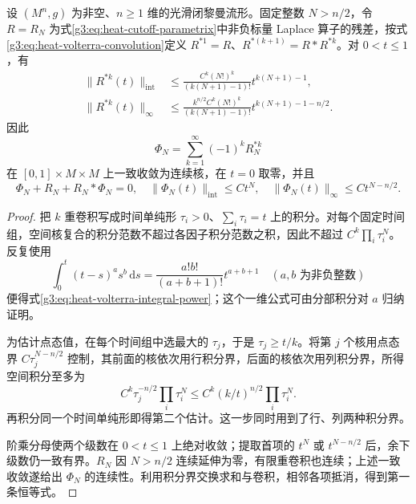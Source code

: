 \begin{lemma}\label{g3:lem:heat-volterra-series}
	设 \((M^n,g)\) 为非空、\(n\ge1\) 维的光滑闭黎曼流形。固定整数 \(N>n/2\)，令 \(R=R_N\) 为式\eqref{g3:eq:heat-cutoff-parametrix}中非负标量 Laplace 算子的残差，按式\eqref{g3:eq:heat-volterra-convolution}定义 \(R^{*1}=R\)、\(R^{*(k+1)}=R*R^{*k}\)。对 \(0<t\le1\)，有
	\begin{align}
		\|R^{*k}(t)\|_{\mathrm{int}}
		&\le\frac{C^k(N!)^k}{(k(N+1)-1)!}
		t^{k(N+1)-1},\label{g3:eq:heat-volterra-integral-power}\\
		\|R^{*k}(t)\|_\infty
		&\le\frac{k^{n/2}C^k(N!)^k}{(k(N+1)-1)!}
		t^{k(N+1)-1-n/2}.\label{g3:eq:heat-volterra-point-power}
	\end{align}
	因此
	\begin{equation}\label{g3:eq:heat-volterra-correction}
		\Phi_N=\sum_{k=1}^\infty(-1)^kR_N^{*k}
	\end{equation}
	在 \([0,1]\times M\times M\) 上一致收敛为连续核，在 \(t=0\) 取零，并且
	\begin{equation}\label{g3:eq:heat-volterra-correction-bounds}
		\Phi_N+R_N+R_N*\Phi_N=0,
		\quad \|\Phi_N(t)\|_{\mathrm{int}}\le Ct^N,
		\quad \|\Phi_N(t)\|_\infty\le Ct^{N-n/2}.
	\end{equation}
\end{lemma}
\begin{proof}
	把 \(k\) 重卷积写成时间单纯形 \(\tau_i>0\)、\(\sum_i\tau_i=t\) 上的积分。对每个固定时间组，空间核复合的积分范数不超过各因子积分范数之积，因此不超过 \(C^k\prod_i\tau_i^N\)。反复使用
	\[
		\int_0^t(t-s)^as^b\,\mathrm ds
		=\frac{a!b!}{(a+b+1)!}t^{a+b+1}
		\quad(a,b\text{ 为非负整数})
	\]
	便得式\eqref{g3:eq:heat-volterra-integral-power}；这个一维公式可由分部积分对 \(a\) 归纳证明。

	为估计点态值，在每个时间组中选最大的 \(\tau_j\)，于是 \(\tau_j\ge t/k\)。将第 \(j\) 个核用点态界 \(C\tau_j^{N-n/2}\) 控制，其前面的核依次用行积分界，后面的核依次用列积分界，所得空间积分至多为
	\[
		C^k\tau_j^{-n/2}\prod_i\tau_i^N
		\le C^k(k/t)^{n/2}\prod_i\tau_i^N.
	\]
	再积分同一个时间单纯形即得第二个估计。这一步同时用到了行、列两种积分界。

	阶乘分母使两个级数在 \(0<t\le1\) 上绝对收敛；提取首项的 \(t^N\) 或 \(t^{N-n/2}\) 后，余下级数仍一致有界。\(R_N\) 因 \(N>n/2\) 连续延伸为零，有限重卷积也连续；上述一致收敛遂给出 \(\Phi_N\) 的连续性。利用积分界交换求和与卷积，相邻各项抵消，得到第一条恒等式。
\end{proof}

